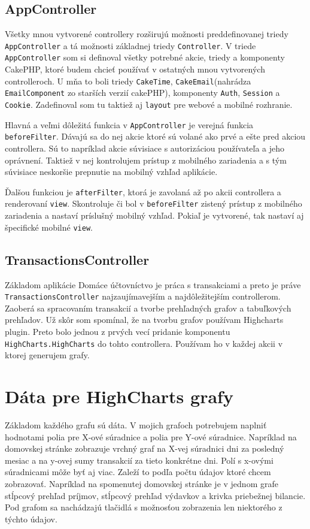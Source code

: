 \documentclass[12pt,oneside]{book}
\begin{document}
\subsection{AppController}
Všetky mnou vytvorené controllery rozširujú možnosti preddefinovanej triedy \texttt{AppController} a tá možnosti základnej triedy \texttt{Controller}. V triede \texttt{AppController} som si definoval všetky potrebné akcie, triedy a komponenty CakePHP, ktoré budem chcieť používať v ostatných mnou vytvorených controlleroch. U mňa to boli triedy \texttt{CakeTime}, \texttt{CakeEmail}(nahrádza \texttt{EmailComponent} zo starších verzií cakePHP), komponenty \texttt{Auth}, \texttt{Session} a \texttt{Cookie}. Zadefinoval som tu taktiež aj \texttt{layout} pre webové a mobilné rozhranie.

Hlavná a veľmi dôležitá funkcia v \texttt{AppController} je verejná funkcia \texttt{beforeFilter}. Dávajú sa do nej akcie ktoré sú volané ako prvé a ešte pred akciou controllera. Sú to napríklad akcie súvisiace s autorizáciou používateľa a jeho oprávnení. Taktiež v nej kontrolujem prístup z mobilného zariadenia a s tým súvisiace neskoršie prepnutie na mobilný vzhľad aplikácie.

Ďalšou funkciou je \texttt{afterFilter}, ktorá je zavolaná až po akcii controllera a renderovaní \texttt{view}. Skontroluje či bol v \texttt{beforeFilter} zistený prístup z mobilného zariadenia a nastaví príslušný mobilný vzhľad. Pokiaľ je vytvorené, tak nastaví aj špecifické mobilné \texttt{view}.


\subsection{TransactionsController}
Základom aplikácie Domáce účtovníctvo je práca s transakciami a preto je práve \texttt{TransactionsController} najzaujímavejším a najdôležitejším controllerom. Zaoberá sa spracovaním transakcií a tvorbe prehľadných grafov a tabuľkových prehľadov. Už skôr som spomínal, že na tvorbu grafov používam Highcharts plugin. Preto bolo jednou z prvých vecí pridanie komponentu \texttt{HighCharts.HighCharts} do tohto controllera. Používam ho v každej akcii v ktorej generujem grafy. 

\section{Dáta pre HighCharts grafy} 
Základom každého grafu sú dáta. V mojich grafoch potrebujem naplniť hodnotami polia pre X-ové súradnice a polia pre Y-ové súradnice. Napríklad na domovskej stránke zobrazuje vrchný graf na X-vej súradnici dni za posledný mesiac a na y-ovej sumy transakcií za tieto konkrétne dni. Polí s x-ovými súradnicami môže byť aj viac. Zaleží to podľa počtu údajov ktoré chcem zobrazovať. Napríklad na spomenutej domovskej stránke je v jednom grafe stĺpcový prehľad príjmov, stĺpcový prehľad výdavkov a krivka priebežnej bilancie. Pod grafom sa nachádzajú tlačidlá s možnosťou zobrazenia len niektorého z týchto údajov. 
\end{document}
